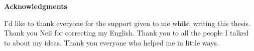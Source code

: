 \clearemptydoublepage
{}
{}	



\vspace*{2cm}

\begin{center}
{\Large \bf Acknowledgments}
\end{center}

\vspace{1cm}




I'd like to thank everyone for the support given to me whilst writing this thesis. Thank you Neil for correcting my English. Thank you to all the people I talked to about my ideas. Thank you everyone who helped me in little ways.